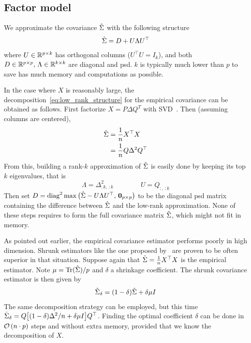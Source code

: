 \subsection{Factor model}\label{subsec:factor_model}

We approximate the covariance $\hat{\Sigma}$ with the following structure
\begin{equation}\label{eq:low_rank_structure}
\hat{\Sigma} = D + U \Lambda U^\top
\end{equation}
where $U \in \mathbb{R}^{p \times k}$ has orthogonal columns ($U^\top U = I_k$),
and both $D \in \mathbb{R}^{p \times p},\, \Lambda \in \mathbb{R}^{k \times k}$
are diagonal and psd.
$k$ is typically much lower than $p$ to save has much memory and computations as possible.

In the case where $X$ is reasonably large,
the decomposition~\ref{eq:low_rank_structure} for the empirical covariance can be obtained as follows.
First factorize $X = P \Delta Q^T$ with SVD~\citep{svd}.
Then (assuming columns are centered),
\begin{align*}
    \hat{\Sigma} &= \frac{1}{n}X^\top X\\
    &= \frac{1}{n}Q \Delta^2 Q^\top
\end{align*}
From this, building a rank-$k$ approximation of $\hat{\Sigma}$ is easily done by keeping its top $k$ eigenvalues,
that is
\begin{equation*}
    \Lambda = \Delta^2_{:k,\, :k} \qquad\qquad U = Q_{:,\, :k}
\end{equation*}
Then set $D = \operatorname*{diag}^2\max \big( \hat{\Sigma} - U \Lambda U^\top,\, \mathbf{0}_{p \times p} \big)$
to be the diagonal psd matrix containing
the difference between $\hat{\Sigma}$ and the low-rank approximation.
None of these steps requires to form the full covariance matrix $\hat{\Sigma}$, which might not fit in memory.

As pointed out earlier, the empirical covariance estimator performs poorly in high dimension.
Shrunk estimators like the one proposed by~\cite{ledoit_wolf} are proven to be often superior in that situation.
Suppose again that $\hat{\Sigma} = \frac{1}{n}X^\top X$ is the empirical estimator.
Note $\mu = \operatorname*{Tr}( \hat{\Sigma} ) / p$ and $\delta$ a shrinkage coefficient.
The shrunk covariance estimator is then given by
\begin{equation*}
    \hat{\Sigma}_\delta = (1 - \delta)\hat{\Sigma} + \delta\mu I
\end{equation*}
The same decomposition strategy can be employed,
but this time $\hat{\Sigma}_\delta = Q\big[ (1 - \delta) \Delta^2 / n + \delta\mu I \big] Q^\top$.
Finding the optimal coefficient $\delta$ can be done in $\mathcal{O}\left( n \cdot p \right)$ steps
and without extra memory, provided that we know the decomposition of $X$.


